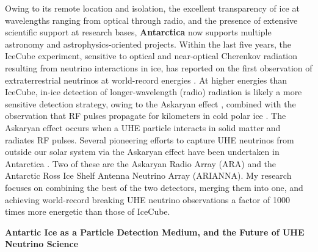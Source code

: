 \documentclass[../main.tex]{subfiles}
\begin{document}
Owing to its remote location and isolation, the excellent transparency of ice at wavelengths ranging from optical through radio, and the presence of extensive scientific support at research bases, \textbf{Antarctica} now supports multiple astronomy and astrophysics-oriented projects.  Within the last five years,  the IceCube experiment, sensitive to optical and near-optical Cherenkov radiation resulting from neutrino interactions in ice, has reported on the first observation of extraterrestrial neutrinos at world-record energies \cite{Aartsen:2016xlq}.  At higher energies than IceCube, in-ice detection of longer-wavelength (radio) radiation is likely a more sensitive detection strategy, owing to the Askaryan effect \cite{Askaryan:1962hbi,1962JPSJS..17C.257A,1965JETP...21..658A}, combined with the observation that RF pulses propagate for kilometers in cold polar ice \cite{barrella_barwick_saltzberg_2011,barwick_besson_gorham_saltzberg_2005}.  The Askaryan effect occurs when a UHE particle interacts in solid matter and radiates RF pulses.  Several pioneering efforts to capture UHE neutrinos from outside our solar system via the Askaryan effect have been undertaken in Antarctica \cite{Allison:2015eky,Barwick:2014pca,Gorham:2008dv,Kravchenko:2001id}.  Two of these are the Askaryan Radio Array (ARA) and the Antarctic Ross Ice Shelf Antenna Neutrino Array (ARIANNA).  My research focuses on combining the best of the two detectors, merging them into one, and achieving world-record breaking UHE neutrino observations a factor of 1000 times more energetic than those of IceCube. \\ \hspace{0.1cm}

\textbf{Antartic Ice as a Particle Detection Medium, and the Future of UHE Neutrino Science} \\ \hspace{0.1cm}
\end{document}
